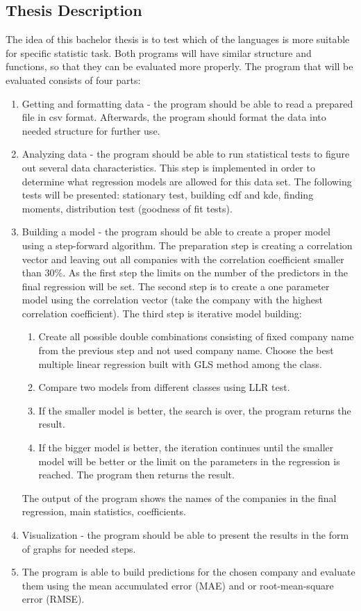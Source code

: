 \documentclass [twoside,
  11pt, a4paper,
  footinclude=true,
  headinclude=true,
  cleardoublepage=empty
]{article}
\begin{document}
\subsection{Thesis Description}
The idea of this bachelor thesis is to test which of the languages is more suitable for specific statistic task. Both programs will have similar structure and functions, so that they can be evaluated more properly. The program that will be evaluated consists of four parts:
\begin{enumerate}
    \item Getting and formatting data - the program should be able to read a prepared file in csv format. Afterwards, the program should format the data into needed structure for further use.
    \item Analyzing data - the program should be able to run statistical tests to figure out several data characteristics. This step is implemented in order to determine what regression models are allowed for this data set. The following tests will be presented: stationary test, building cdf and kde, finding moments, distribution test (goodness of fit tests).
    \item Building a model - the program should be able to create a proper model using a step-forward algorithm. The preparation step is creating a correlation vector and leaving out all companies with the correlation coefficient smaller than 30\%. As the first step the limits on the number of the predictors in the final regression will be set. The second step is to create a one parameter model using the correlation vector (take the company with the highest correlation coefficient). The third step is iterative model building: 
    \begin{enumerate}
        \item Create all possible double combinations consisting of fixed company name from the previous step and not used company name. Choose the best multiple linear regression built with GLS method among the class. 
        \item Compare two models from different classes using LLR test.
        \item If the smaller model is better, the search is over, the program returns the result.
        \item If the bigger model is better, the iteration continues until the smaller model will be better or the limit on the parameters in the regression is reached. The program then returns the result. 
    \end{enumerate}
The output of the program shows the names of the companies in the final regression, main statistics, coefficients.
    \item Visualization - the program should be able to present the results in the form of graphs for needed steps.
    \item The program is able to build predictions for the chosen company and evaluate them using the mean accumulated error (MAE) and or root-mean-square error (RMSE).
\end{enumerate}
\end{document}

